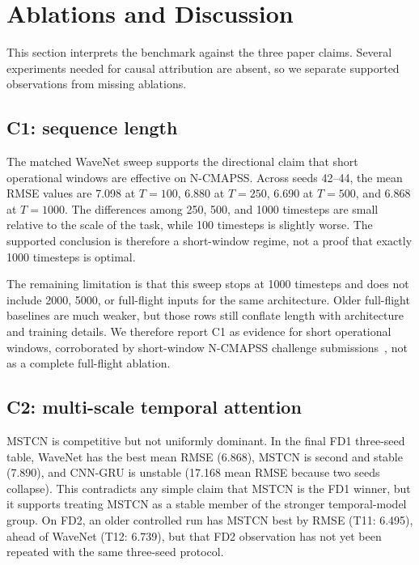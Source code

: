 \section{Ablations and Discussion}
\label{sec:ablations}

This section interprets the benchmark against the three paper claims. Several experiments needed for causal attribution are absent, so we separate supported observations from missing ablations.

\subsection{C1: sequence length}

The matched WaveNet sweep supports the directional claim that short operational windows are effective on N-CMAPSS. Across seeds 42--44, the mean RMSE values are 7.098 at $T{=}100$, 6.880 at $T{=}250$, 6.690 at $T{=}500$, and 6.868 at $T{=}1000$. The differences among 250, 500, and 1000 timesteps are small relative to the scale of the task, while 100 timesteps is slightly worse. The supported conclusion is therefore a short-window regime, not a proof that exactly 1000 timesteps is optimal.

The remaining limitation is that this sweep stops at 1000 timesteps and does not include 2000, 5000, or full-flight inputs for the same architecture. Older full-flight baselines are much weaker, but those rows still conflate length with architecture and training details. We therefore report C1 as evidence for short operational windows, corroborated by short-window N-CMAPSS challenge submissions~\cite{lovberg2021variable,solismartin2021stacked}, not as a complete full-flight ablation.

\subsection{C2: multi-scale temporal attention}

MSTCN is competitive but not uniformly dominant. In the final FD1 three-seed table, WaveNet has the best mean RMSE (6.868), MSTCN is second and stable (7.890), and CNN-GRU is unstable (17.168 mean RMSE because two seeds collapse). This contradicts any simple claim that MSTCN is the FD1 winner, but it supports treating MSTCN as a stable member of the stronger temporal-model group. On FD2, an older controlled run has MSTCN best by RMSE (T11: 6.495), ahead of WaveNet (T12: 6.739), but that FD2 observation has not yet been repeated with the same three-seed protocol.

